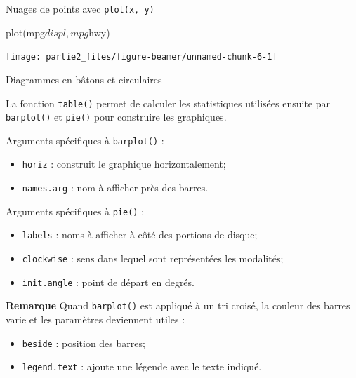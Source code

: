 \documentclass[12pt,ignorenonframetext,]{beamer}
\newenvironment{Shaded}{}{}
\newcommand{\KeywordTok}[1]{\textcolor[rgb]{0.00,0.00,1.00}{#1}}
\newcommand{\OperatorTok}[1]{#1}
\newcommand{\NormalTok}[1]{#1}
\providecommand{\tightlist}{%
  \setlength{\itemsep}{0pt}\setlength{\parskip}{0pt}}
\renewenvironment{Shaded}{\begin{snugshade}}{\end{snugshade}}
\newcommand{\intertitre}[1]{\textcolor{redInsee}{\textbf{#1}}}
\begin{document}
\begin{frame}[fragile]{Nuages de points avec \texttt{plot(x,\ y)}}

\centering \footnotesize

\begin{Shaded}
\begin{Highlighting}[]
\KeywordTok{plot}\NormalTok{(mpg}\OperatorTok{$}\NormalTok{displ, mpg}\OperatorTok{$}\NormalTok{hwy)}
\end{Highlighting}
\end{Shaded}

\texttt{[image: partie2\_files/figure-beamer/unnamed-chunk-6-1]}

\end{frame}

\begin{frame}[fragile]{Diagrammes en bâtons et circulaires}

La fonction \texttt{table()} permet de calculer les statistiques
utilisées ensuite par \texttt{barplot()} et \texttt{pie()} pour
construire les graphiques.

\pause Arguments spécifiques à \texttt{barplot()} : \vspace{-3mm}

\begin{itemize}
\tightlist
\item
  \texttt{horiz} : construit le graphique horizontalement;
\item
  \texttt{names.arg} : nom à afficher près des barres.
\end{itemize}

\pause Arguments spécifiques à \texttt{pie()} : \vspace{-3mm}

\begin{itemize}
\tightlist
\item
  \texttt{labels} : noms à afficher à côté des portions de disque;
\item
  \texttt{clockwise} : sens dans lequel sont représentées les modalités;
\item
  \texttt{init.angle} : point de départ en degrés.
\end{itemize}

\pause

\intertitre{Remarque} Quand \texttt{barplot()} est appliqué à un tri
croisé, la couleur des barres varie et les paramètres deviennent utiles
: \vspace{-3mm}

\begin{itemize}
\tightlist
\item
  \texttt{beside} : position des barres;
\item
  \texttt{legend.text} : ajoute une légende avec le texte indiqué.
\end{itemize}

\end{frame}
\end{document}
